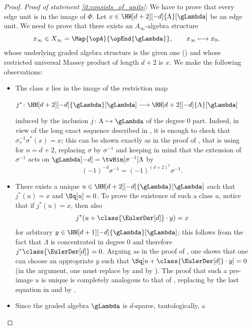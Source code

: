 \documentclass[a4paper]{amsart}
\begin{document}
\begin{proof}
  \emph{Proof of statement \eqref{it:consists_of_units}:} We have to prove that
  every edge unit is in the image of $\Phi$. Let
  $x\in\HH[d+2][-d]{\Lambda}[\gLambda]$ be an edge unit. We need to prove that
  there exists an $A_\infty$-algebra structure
  \[
    x_\infty\in X_\infty=\Map{\opA}{\opEnd{\gLambda}},\qquad x_\infty\longmapsto
    x_0,
  \]
  whose underlying graded algebra structure is the given one
  () and whose restricted universal Massey product of
  length $d+2$ is $x$. We make the following observations:
  \begin{itemize}
  \item The class $x$ lies in the image of the restriction map
    \begin{center}
      $j^*\colon\HH[d+2][-d]{\gLambda}[\gLambda]\longrightarrow\HH[d+2][-d]{\Lambda}[\gLambda]$
    \end{center}
    induced by the inclusion $j\colon\Lambda\hookrightarrow\gLambda$ of the
    degree $0$ part. Indeed, in view of the long exact sequence described in
    , it is enough to check that
    $\sigma_*^{-1}\sigma^*(x)=x$; this can be shown exactly as in the proof of
    \cite[Cor.~7.7]{Mur22}, that is using \cite[Prop.~7.6]{Mur22} for $n=d+2$,
    replacing $\sigma$ by $\sigma^{-1}$ and keeping in mind that the extension
    of $\sigma^{-1}$ acts on $\gLambda[-d]=\twBim[\sigma^{-1}]{\Lambda}$ by
    \[
      (-1)^{-d}\sigma^{-1}=(-1)^{(d+2)^2}\sigma^{-1}.
    \]
  \item There exists a unique $u\in\HH[d+2][-d]{\gLambda}[\gLambda]$ such that
    $j^*(u)=x$ and $\Sq[u]=0$. To prove the existence of such a class $u$,
    notice that if $j^*(u)=x$, then also
    \[
      j^*(u+\class{\EulerDer[d]}\cdot y)=x
    \]
    for arbitrary $y\in\HH[d+1][-d]{\gLambda}[\gLambda]$; this follows from the
    fact that $\Lambda$ is concentrated in degree $0$ and therefore
    $j^*\class{\EulerDer[d]}=0$. Arguing as in the proof of
    \cite[Prop.~7.9]{Mur22}, one shows that one can choose an appropriate $y$
    such that $\Sq[u+\class{\EulerDer[d]}\cdot y]=0$ (in the argument, one must
    replace \cite[Props.~3.6, 3.9 and 3.10]{Mur22} by
     and \cite[Lemma~6.8]{Mur22} by
    ). The proof that such a pre-image $u$ is unique
    is completely analogous to that of \cite[Prop.~7.10]{Mur22}, replacing
    \cite[Prop.~3.6]{Mur22} by the last equation in 
    and \cite[Lemma~6.8]{Mur22} by .
  \item Since the graded algebra $\gLambda$ is $d$-sparse, tautologically, a

\end{itemize}
\end{proof}
\end{document}
